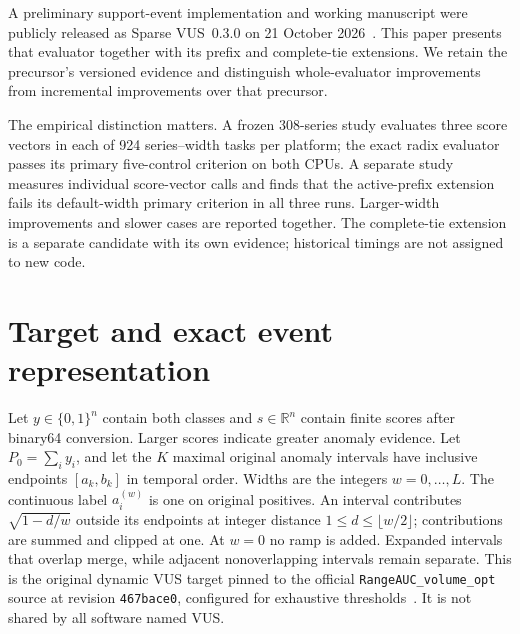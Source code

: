 A preliminary support-event implementation and working manuscript were
publicly released as Sparse VUS~0.3.0 on 21 October
2026~\cite{sparsevus03}. This paper presents that evaluator together with
its prefix and complete-tie extensions. We retain the precursor's
versioned evidence and distinguish whole-evaluator improvements
from incremental improvements over that precursor.

The empirical distinction matters. A frozen 308-series study evaluates
three score vectors in each of 924 series--width tasks per platform;
the exact radix evaluator passes its primary five-control criterion on
both CPUs. A separate study measures individual score-vector calls and
finds that the active-prefix extension fails its default-width primary
criterion in all three runs. Larger-width improvements and slower cases
are reported together. The complete-tie extension is a separate candidate
with its own evidence; historical timings are not assigned to new code.

\section{Target and exact event representation}
Let $y\in\{0,1\}^n$ contain both classes and $s\in\mathbb{R}^n$ contain finite
scores after binary64 conversion. Larger scores indicate greater anomaly
evidence. Let $P_0=\sum_i y_i$, and let the $K$ maximal original anomaly
intervals have inclusive endpoints $[a_k,b_k]$ in temporal order. Widths are
the integers $w=0,\ldots,L$. The continuous label $a_i^{(w)}$ is one on
original positives. An interval contributes $\sqrt{1-d/w}$ outside its
endpoints at integer distance $1\le d\le\lfloor w/2\rfloor$; contributions
are summed and clipped at one. At $w=0$ no ramp is added. Expanded intervals
that overlap merge, while adjacent nonoverlapping intervals remain separate.
This is the original dynamic VUS target pinned to the official
\texttt{RangeAUC\_volume\_opt} source at revision
\texttt{467bace0}, configured for exhaustive thresholds~\cite{vusreference}.
It is not shared by all software named VUS.

